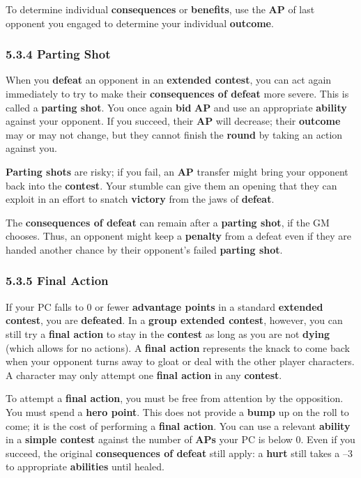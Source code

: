 \documentclass[
]{article}
\begin{document}
To determine individual \textbf{consequences} or \textbf{benefits}, use
the \textbf{AP} of last opponent you engaged to determine your
individual \textbf{outcome}.

\hypertarget{parting-shot-1}{%
\subsubsection{5.3.4 Parting Shot}\label{parting-shot-1}}

When you \textbf{defeat} an opponent in an \textbf{extended contest},
you can act again immediately to try to make their \textbf{consequences
of defeat} more severe. This is called a \textbf{parting shot}. You once
again \textbf{bid} \textbf{AP} and use an appropriate \textbf{ability}
against your opponent. If you succeed, their \textbf{AP} will decrease;
their \textbf{outcome} may or may not change, but they cannot finish the
\textbf{round} by taking an action against you.

\textbf{Parting shots} are risky; if you fail, an \textbf{AP} transfer
might bring your opponent back into the \textbf{contest}. Your stumble
can give them an opening that they can exploit in an effort to snatch
\textbf{victory} from the jaws of \textbf{defeat}.

The \textbf{consequences of defeat} can remain after a \textbf{parting
shot}, if the GM chooses. Thus, an opponent might keep a
\textbf{penalty} from a defeat even if they are handed another chance by
their opponent's failed \textbf{parting shot}.

\hypertarget{final-action}{%
\subsubsection{5.3.5 Final Action}\label{final-action}}

If your PC falls to 0 or fewer \textbf{advantage points} in a standard
\textbf{extended contest}, you are \textbf{defeated}. In a \textbf{group
extended contest}, however, you can still try a \textbf{final action} to
stay in the \textbf{contest} as long as you are not \textbf{dying}
(which allows for no actions). A \textbf{final action} represents the
knack to come back when your opponent turns away to gloat or deal with
the other player characters. A character may only attempt one
\textbf{final action} in any \textbf{contest}.

To attempt a \textbf{final action}, you must be free from attention by
the opposition. You must spend a \textbf{hero point}. This does not
provide a \textbf{bump} up on the roll to come; it is the cost of
performing a \textbf{final action}. You can use a relevant
\textbf{ability} in a \textbf{simple contest} against the number of
\textbf{APs} your PC is below 0. Even if you succeed, the original
\textbf{consequences of defeat} still apply: a \textbf{hurt} still takes
a --3 to appropriate \textbf{abilities} until healed.
\end{document}
